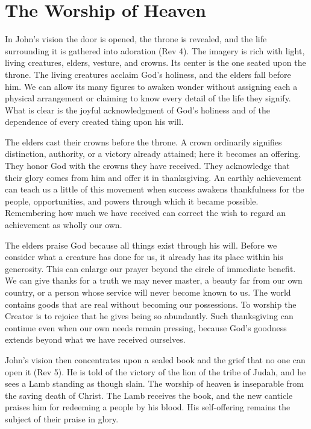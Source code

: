 \section{The Worship of Heaven}

In John's vision the door is opened, the throne is revealed, and the life surrounding it is gathered into adoration (Rev 4). The imagery is rich with light, living creatures, elders, vesture, and crowns. Its center is the one seated upon the throne. The living creatures acclaim God's holiness, and the elders fall before him. We can allow its many figures to awaken wonder without assigning each a physical arrangement or claiming to know every detail of the life they signify. What is clear is the joyful acknowledgment of God's holiness and of the dependence of every created thing upon his will.

The elders cast their crowns before the throne. A crown ordinarily signifies distinction, authority, or a victory already attained; here it becomes an offering. They honor God with the crowns they have received. They acknowledge that their glory comes from him and offer it in thanksgiving. An earthly achievement can teach us a little of this movement when success awakens thankfulness for the people, opportunities, and powers through which it became possible. Remembering how much we have received can correct the wish to regard an achievement as wholly our own.

The elders praise God because all things exist through his will. Before we consider what a creature has done for us, it already has its place within his generosity. This can enlarge our prayer beyond the circle of immediate benefit. We can give thanks for a truth we may never master, a beauty far from our own country, or a person whose service will never become known to us. The world contains goods that are real without becoming our possessions. To worship the Creator is to rejoice that he gives being so abundantly. Such thanksgiving can continue even when our own needs remain pressing, because God's goodness extends beyond what we have received ourselves.

John's vision then concentrates upon a sealed book and the grief that no one can open it (Rev 5). He is told of the victory of the lion of the tribe of Judah, and he sees a Lamb standing as though slain. The worship of heaven is inseparable from the saving death of Christ. The Lamb receives the book, and the new canticle praises him for redeeming a people by his blood. His self-offering remains the subject of their praise in glory.

